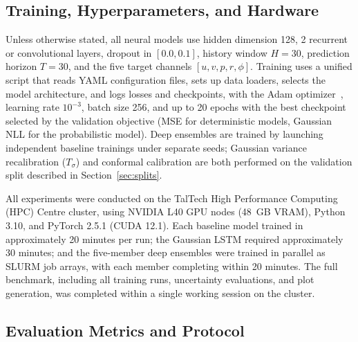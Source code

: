 \documentclass[a4paper,fleqn]{cas-sc}
\begin{document}
\subsection{Training, Hyperparameters, and Hardware}
\label{sec:training}

Unless otherwise stated, all neural models use hidden dimension 128, 2 recurrent or convolutional layers, dropout in $[0.0, 0.1]$, history window $H=30$, prediction horizon $T=30$, and the five target channels $[u, v, p, r, \phi]$. Training uses a unified script that reads YAML configuration files, sets up data loaders, selects the model architecture, and logs losses and checkpoints, with the Adam optimizer~\cite{kingma2015adam}, learning rate $10^{-3}$, batch size 256, and up to 20 epochs with the best checkpoint selected by the validation objective (MSE for deterministic models, Gaussian NLL for the probabilistic model). Deep ensembles are trained by launching independent baseline trainings under separate seeds; Gaussian variance recalibration ($T_\sigma$) and conformal calibration are both performed on the validation split described in Section~\ref{sec:splits}.

All experiments were conducted on the TalTech High Performance Computing (HPC) Centre cluster, using NVIDIA L40 GPU nodes (48~GB VRAM), Python 3.10, and PyTorch 2.5.1 (CUDA 12.1). Each baseline model trained in approximately 20 minutes per run; the Gaussian LSTM required approximately 30 minutes; and the five-member deep ensembles were trained in parallel as SLURM job arrays, with each member completing within 20 minutes. The full benchmark, including all training runs, uncertainty evaluations, and plot generation, was completed within a single working session on the cluster.

\subsection{Evaluation Metrics and Protocol}
\label{sec:eval-protocol}
\end{document}

